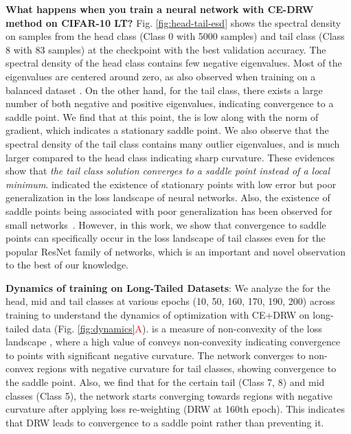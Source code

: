 \documentclass{article}
\begin{document}
\textbf{What happens when you train a neural network with CE-DRW method on CIFAR-10 LT?}
Fig. \ref{fig:head-tail-esd} shows the spectral density on samples from the head class (Class 0 with 5000 samples) and tail class (Class 8 with 83 samples) at the checkpoint with the best validation accuracy. The spectral density of the head class contains few negative eigenvalues. Most of the eigenvalues are centered around zero, as also observed when training on a balanced dataset \cite{pmlr-v97-ghorbani19b}. On the other hand, for the tail class, there exists a large number of both negative and positive eigenvalues, indicating convergence to a saddle point. We find that at this point, the  is low along with the norm of gradient, which indicates a stationary saddle point. We also observe that the spectral density of the tail class contains many outlier eigenvalues, and  is much larger compared to the head class indicating sharp curvature. These evidences show that \emph{the tail class solution converges to a saddle point instead of a local minimum}. \citet{merkulov2019empirical} indicated the existence of stationary points with low error but poor generalization in the loss landscape of neural networks. Also, the existence of saddle points being associated with poor generalization has been observed for small networks~\cite{dauphin2014identifying}. However, in this work, we show that convergence to saddle points can specifically occur in the loss landscape of tail classes even for the popular ResNet \cite{He_2016_CVPR} family of networks, which is an important and novel observation to the best of our knowledge. 


\textbf{Dynamics of training on Long-Tailed Datasets}: We analyze the  for the head, mid and tail classes at various epochs (10, 50, 160, 170, 190, 200) across training to understand the dynamics of optimization with CE+DRW on long-tailed data (Fig. \ref{fig:dynamics}\textcolor{red}{A}).  is a measure of non-convexity of the loss landscape \cite{li2018visualizing}, where a high value of  conveys non-convexity indicating convergence to points with significant negative curvature. The network converges to non-convex regions with negative curvature for tail classes, showing convergence to the saddle point. Also, we find that for the certain tail (Class 7, 8) and mid classes (Class 5), the network starts converging towards regions with negative curvature after applying loss re-weighting (DRW at 160th epoch). This indicates that DRW leads to convergence to a saddle point rather than preventing it. 
\end{document}
